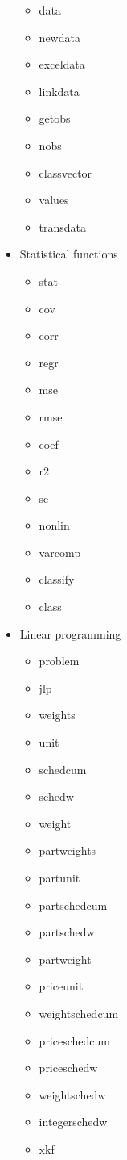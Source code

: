 \begin{itemize}
\begin{itemize}
\item data
\item newdata
\item exceldata
\item linkdata
\item getobs
\item nobs
\item classvector
\item values
\item transdata
\end{itemize}
\item  Statistical functions
\begin{itemize}
\item stat
\item cov
\item corr
\item regr
\item mse
\item rmse
\item coef
\item r2
\item se
\item nonlin
\item varcomp
\item classify
\item class
\end{itemize}
\item  Linear programming
\begin{itemize}
\item problem
\item jlp
\item weights
\item unit
\item schedcum
\item schedw
\item weight
\item partweights
\item partunit
\item partschedcum
\item partschedw
\item partweight
\item priceunit
\item weightschedcum
\item priceschedcum
\item priceschedw
\item weightschedw
\item integerschedw
\item xkf

\end{itemize}
\end{itemize}
